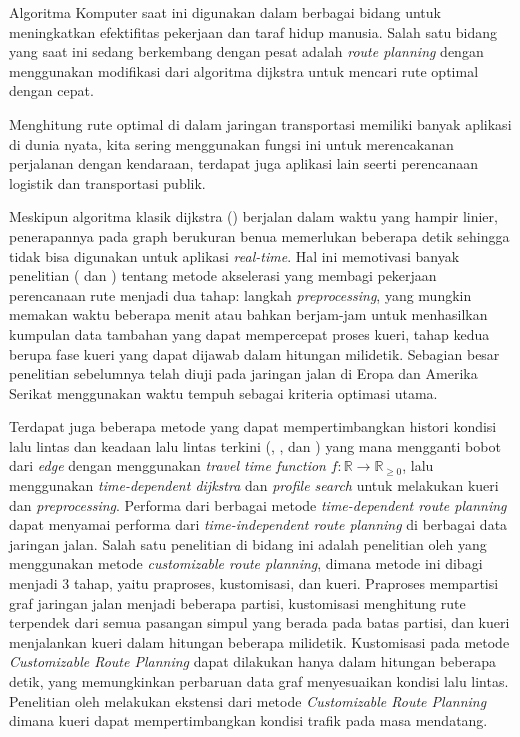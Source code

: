 Algoritma Komputer saat ini digunakan dalam berbagai bidang untuk meningkatkan efektifitas pekerjaan dan taraf hidup manusia. Salah satu bidang yang saat ini sedang berkembang dengan pesat adalah \textit{route planning} dengan menggunakan modifikasi dari algoritma dijkstra untuk mencari rute optimal dengan cepat. 

Menghitung rute optimal di dalam jaringan transportasi memiliki banyak aplikasi di dunia nyata, kita sering menggunakan fungsi ini untuk merencakanan perjalanan dengan kendaraan, terdapat juga aplikasi lain seerti perencanaan logistik dan transportasi publik.

Meskipun algoritma klasik dijkstra (\cite{Dijkstra59}) berjalan dalam waktu yang hampir linier, penerapannya pada graph berukuran benua memerlukan beberapa detik sehingga tidak bisa digunakan untuk aplikasi \textit{real-time}. Hal ini memotivasi banyak penelitian (\cite{Delling2009} dan \cite{Bast2015}) tentang metode akselerasi yang membagi pekerjaan perencanaan rute menjadi dua tahap: langkah \textit{preprocessing}, yang mungkin memakan waktu beberapa menit atau bahkan berjam-jam untuk menhasilkan kumpulan data tambahan yang dapat mempercepat proses kueri, tahap  kedua berupa fase kueri yang dapat dijawab dalam hitungan milidetik. Sebagian besar penelitian sebelumnya telah diuji pada jaringan jalan di Eropa dan Amerika Serikat menggunakan waktu tempuh sebagai kriteria optimasi utama.

Terdapat juga beberapa metode yang dapat mempertimbangkan histori kondisi lalu lintas dan keadaan lalu lintas terkini (\cite{DellingTD2009}, \cite{Baum2015}, dan \cite{Veit2013}) yang mana mengganti bobot dari \textit{edge} dengan menggunakan \textit{travel time function} $f : \mathbb{R} \to \mathbb{R}_{\geq 0}$, lalu menggunakan \textit{time-dependent dijkstra} dan \textit{profile search} untuk melakukan kueri dan \textit{preprocessing}. Performa dari berbagai metode \textit{time-dependent route planning} dapat menyamai performa dari \textit{time-independent route planning} di berbagai data jaringan jalan. Salah satu penelitian di bidang ini adalah penelitian oleh \cite{Delling2015} yang menggunakan metode \textit{customizable route planning}, dimana metode ini dibagi menjadi 3 tahap, yaitu praproses, kustomisasi, dan kueri. Praproses mempartisi graf jaringan jalan menjadi beberapa partisi, kustomisasi menghitung rute terpendek dari semua pasangan simpul yang berada pada batas partisi, dan kueri menjalankan kueri dalam hitungan beberapa milidetik. Kustomisasi pada metode \textit{Customizable Route Planning} dapat dilakukan hanya dalam hitungan beberapa detik, yang memungkinkan perbaruan data graf menyesuaikan kondisi lalu lintas. Penelitian oleh \cite{Baum2015} melakukan ekstensi dari metode \textit{Customizable Route Planning} dimana kueri dapat mempertimbangkan kondisi trafik pada masa mendatang.

